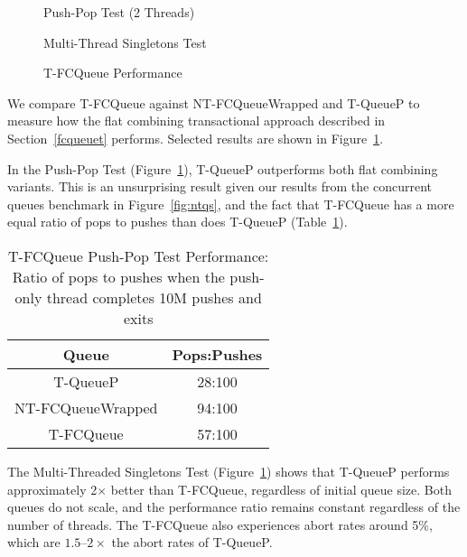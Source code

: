 \begin{figure}[ht!]
    \centering
	\begin{minipage}{0.75\textwidth}
        \caption*{Push-Pop Test (2 Threads)}
        \vspace{12pt}
	\end{minipage}
   	\begin{minipage}{0.75\textwidth}
        \caption*{Multi-Thread Singletons Test}
	\end{minipage}
        \caption{T-FCQueue Performance}
    \label{fig:tqs}
\end{figure}

We compare T-FCQueue against NT-FCQueueWrapped and T-QueueP to measure how the flat combining transactional approach described in Section~\ref{fcqueuet} performs. Selected results are shown in Figure~\ref{fig:tqs}.

In the Push-Pop Test (Figure~\ref{fig:tqs}), T-QueueP outperforms both flat combining variants. This is an unsurprising result given our results from the concurrent queues benchmark in Figure~\ref{fig:ntqs}, and the fact that T-FCQueue has a more equal ratio of pops to pushes than does T-QueueP (Table~\ref{tab:tfc_pop_push_ratio}). 

\begin{table}[t]
        \centering
    \begin{tabular}{|cc|}
        \hline
        Queue & Pops:Pushes\\
        \hline
            T-QueueP & 28:100\\
            NT-FCQueueWrapped & 94:100\\
            T-FCQueue & 57:100\\
        \hline
    \end{tabular}

    \caption{T-FCQueue Push-Pop Test Performance: Ratio of pops to pushes when the push-only thread completes 10M pushes and exits}
    \label{tab:tfc_pop_push_ratio}
\end{table}

The Multi-Threaded Singletons Test (Figure~\ref{fig:tqs}) shows that T-QueueP performs approximately 2$\times$ better than T-FCQueue, regardless of initial queue size. Both queues do not scale, and the performance ratio remains constant regardless of the number of threads. The T-FCQueue also experiences abort rates around 5\%, which are $1.5$--$2\times$ the abort rates of T-QueueP.

